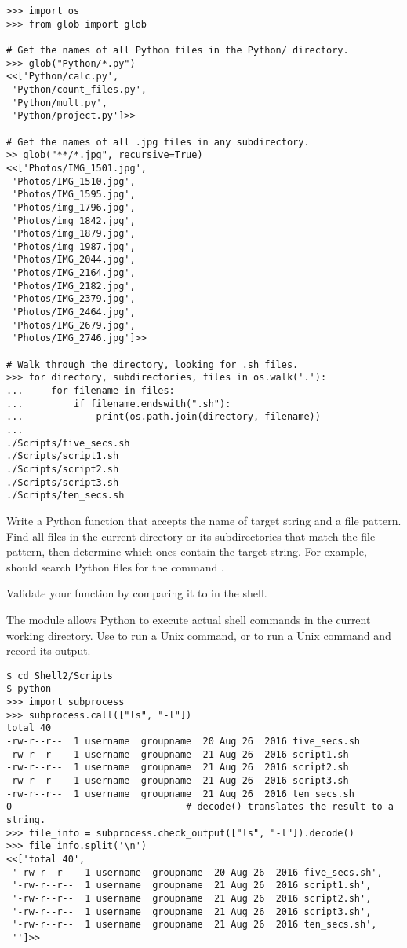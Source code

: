 \begin{lstlisting}
>>> import os
>>> from glob import glob

# Get the names of all Python files in the Python/ directory.
>>> glob("Python/*.py")
<<['Python/calc.py',
 'Python/count_files.py',
 'Python/mult.py',
 'Python/project.py']>>

# Get the names of all .jpg files in any subdirectory.
>> glob("**/*.jpg", recursive=True)
<<['Photos/IMG_1501.jpg',
 'Photos/IMG_1510.jpg',
 'Photos/IMG_1595.jpg',
 'Photos/img_1796.jpg',
 'Photos/img_1842.jpg',
 'Photos/img_1879.jpg',
 'Photos/img_1987.jpg',
 'Photos/IMG_2044.jpg',
 'Photos/IMG_2164.jpg',
 'Photos/IMG_2182.jpg',
 'Photos/IMG_2379.jpg',
 'Photos/IMG_2464.jpg',
 'Photos/IMG_2679.jpg',
 'Photos/IMG_2746.jpg']>>

# Walk through the directory, looking for .sh files.
>>> for directory, subdirectories, files in os.walk('.'):
...     for filename in files:
...         if filename.endswith(".sh"):
...             print(os.path.join(directory, filename))
...
./Scripts/five_secs.sh
./Scripts/script1.sh
./Scripts/script2.sh
./Scripts/script3.sh
./Scripts/ten_secs.sh
\end{lstlisting}

\begin{problem}
Write a Python function  that accepts the name of target string and a file pattern.
Find all files in the current directory or its subdirectories that match the file pattern, then determine which ones contain the target string.
For example,  should search Python files for the command .

Validate your function by comparing it to  in the shell.
\end{problem}

The  module allows Python to execute actual shell commands in the current working directory.
Use  to run a Unix command, or  to run a Unix command and record its output.

\begin{lstlisting}
$ cd Shell2/Scripts
$ python
>>> import subprocess
>>> subprocess.call(["ls", "-l"])
total 40
-rw-r--r--  1 username  groupname  20 Aug 26  2016 five_secs.sh
-rw-r--r--  1 username  groupname  21 Aug 26  2016 script1.sh
-rw-r--r--  1 username  groupname  21 Aug 26  2016 script2.sh
-rw-r--r--  1 username  groupname  21 Aug 26  2016 script3.sh
-rw-r--r--  1 username  groupname  21 Aug 26  2016 ten_secs.sh
0                               # decode() translates the result to a string.
>>> file_info = subprocess.check_output(["ls", "-l"]).decode()
>>> file_info.split('\n')
<<['total 40',
 '-rw-r--r--  1 username  groupname  20 Aug 26  2016 five_secs.sh',
 '-rw-r--r--  1 username  groupname  21 Aug 26  2016 script1.sh',
 '-rw-r--r--  1 username  groupname  21 Aug 26  2016 script2.sh',
 '-rw-r--r--  1 username  groupname  21 Aug 26  2016 script3.sh',
 '-rw-r--r--  1 username  groupname  21 Aug 26  2016 ten_secs.sh',
 '']>>
\end{lstlisting}

